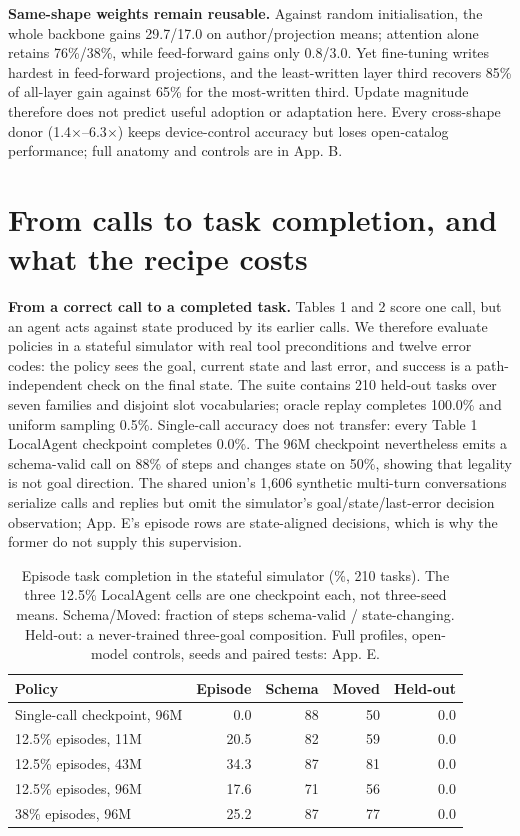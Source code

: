 \documentclass{article}
\begin{document}
\textbf{Same-shape weights remain reusable.} Against random initialisation, the whole backbone
gains 29.7/17.0 on author/projection means; attention alone retains
76\%/38\%, while feed-forward gains only
0.8/3.0. Yet fine-tuning writes hardest in feed-forward projections, and
the least-written layer third recovers 85\% of all-layer gain against 65\% for the most-written
third. Update magnitude therefore does not predict useful adoption or adaptation here. Every
cross-shape donor (1.4$\times$--6.3$\times$) keeps device-control accuracy but loses open-catalog
performance; full anatomy and controls are in App. B.


\section{From calls to task completion, and what the recipe costs}

\textbf{From a correct call to a completed task.} Tables 1 and 2 score one call, but an
agent acts against state produced by its earlier calls. We therefore evaluate policies in a
stateful simulator with real tool preconditions and twelve error codes: the policy sees the
goal, current state and last error, and success is a path-independent check on the final state.
The suite contains 210 held-out tasks over seven families and disjoint slot vocabularies; oracle
replay completes 100.0\% and uniform sampling 0.5\%. Single-call accuracy does not transfer:
every Table 1 LocalAgent checkpoint completes 0.0\%. The 96M checkpoint nevertheless emits a
schema-valid call on 88\% of steps and changes state on 50\%, showing that legality is not goal
direction. The shared union's 1,606 synthetic multi-turn conversations serialize calls and
replies but omit the simulator's goal/state/last-error decision observation; App. E's episode
rows are state-aligned decisions, which is why the former do not supply this supervision.


\begin{table}[htbp]
\caption{Episode task completion in the stateful simulator (\%, 210 tasks). The three 12.5\% LocalAgent cells are one checkpoint each, not three-seed means. Schema/Moved: fraction of steps schema-valid / state-changing. Held-out: a never-trained three-goal composition. Full profiles, open-model controls, seeds and paired tests: App. E.}
\label{tab:episodes_main}
\centering
\footnotesize
\begin{tabular}{lrrrr}
\toprule
Policy & Episode & Schema & Moved & Held-out \\
\midrule
Single-call checkpoint, 96M & 0.0 & 88 & 50 & 0.0 \\
12.5\% episodes, 11M & 20.5 & 82 & 59 & 0.0 \\
12.5\% episodes, 43M & 34.3 & 87 & 81 & 0.0 \\
12.5\% episodes, 96M & 17.6 & 71 & 56 & 0.0 \\
38\% episodes, 96M & 25.2 & 87 & 77 & 0.0 \\
\bottomrule
\end{tabular}
\end{table}
\end{document}
